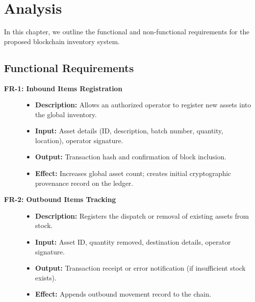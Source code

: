 \documentclass[11pt, a4paper, oneside]{memoir}
\begin{document}
\chapter{Analysis}\label{ch:analysis}

In this chapter, we outline the functional and non-functional requirements for the proposed blockchain inventory system.

\section{Functional Requirements}

\begin{description}
    \item[\textbf{FR-1: Inbound Items Registration}]\hfill
    \begin{itemize}
        \item \textbf{Description:} Allows an authorized operator to register new assets into the global inventory.
        \item \textbf{Input:} Asset details (ID, description, batch number, quantity, location), operator signature.
        \item \textbf{Output:} Transaction hash and confirmation of block inclusion.
        \item \textbf{Effect:} Increases global asset count; creates initial cryptographic provenance record on the ledger.
    \end{itemize}

    \item[\textbf{FR-2: Outbound Items Tracking}]\hfill
    \begin{itemize}
        \item \textbf{Description:} Registers the dispatch or removal of existing assets from stock.
        \item \textbf{Input:} Asset ID, quantity removed, destination details, operator signature.
        \item \textbf{Output:} Transaction receipt or error notification (if insufficient stock exists).
        \item \textbf{Effect:} Appends outbound movement record to the chain.
    \end{itemize}


\end{description}
\end{document}
